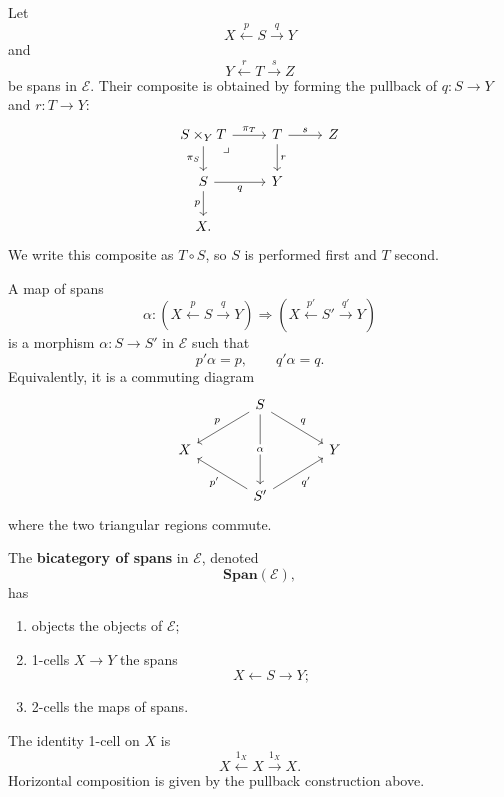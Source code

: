 Let
\[
    X \xleftarrow{p} S \xrightarrow{q} Y
\]
and
\[
    Y \xleftarrow{r} T \xrightarrow{s} Z
\]
be spans in \(\mathcal E\). Their composite is obtained by forming the pullback of \(q:S\to Y\) and \(r:T\to Y\):
\[
    \begin{tikzcd}
            S\times_Y T
                \arrow[r, "\pi_T"]
                \arrow[d, "\pi_S"']
                \arrow[dr, phantom, "\lrcorner", very near start]
        &
            T
                \arrow[r, "s"]
                \arrow[d, "r"]
        & 
            Z
        \\
            S
                \arrow[r, "q"']
                \arrow[d, "p"']
        &
            Y 
        \\
            X.
    \end{tikzcd}
\]
We write this composite as \(T\circ S\), so \(S\) is performed first and \(T\)
second.

A map of spans
\[
    \alpha:
    \left(
        X 
        \xleftarrow{p} 
        S 
        \xrightarrow{q} 
        Y
    \right)
    \Longrightarrow
    \left(
        X 
        \xleftarrow{p'} 
        S' 
        \xrightarrow{q'} 
        Y
    \right)
\]
is a morphism \(\alpha:S\to S'\) in \(\mathcal E\) such that
\[
    p'\alpha=p,
    \qquad
    q'\alpha=q.
\]
Equivalently, it is a commuting diagram
\[
    \begin{tikzcd}[column sep=large]
        & 
            S 
                \arrow[dd, "\alpha" description] 
                \arrow[dl, "p"'] 
                \arrow[dr, "q"] 
        & 
        \\
            X 
        &
        & 
            Y 
        \\
        & 
            S' 
                \arrow[ul, "p'"] 
                \arrow[ur, "q'"'] 
        &
    \end{tikzcd}
\]
where the two triangular regions commute.

\begin{definition}
\label{def:bicategory-of-spans}
    The \textbf{bicategory of spans} in \(\mathcal E\), denoted
    \[
        \mathbf{Span}(\mathcal E),
    \]
    has
    \begin{enumerate}
        \item objects the objects of \(\mathcal E\);

        \item 1-cells \(X\to Y\) the spans
        \[
            X \xleftarrow{} S \xrightarrow{} Y;
        \]

        \item 2-cells the maps of spans.
    \end{enumerate}
    The identity 1-cell on \(X\) is
    \[
        X \xleftarrow{1_X} X \xrightarrow{1_X} X.
    \]
    Horizontal composition is given by the pullback construction above.
\end{definition}


